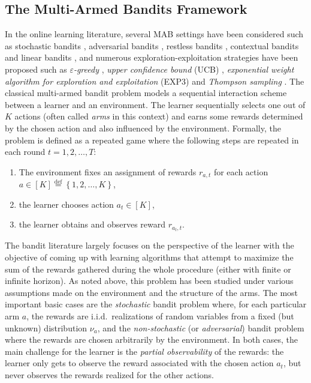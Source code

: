 \documentclass{article}
\begin{document}
	\subsection{The Multi-Armed Bandits Framework}
	In the online learning literature, several MAB settings have been considered such as stochastic bandits \cite{thompson1933likelihood,lai1985asymptotically,auer2002finite}, adversarial bandits \cite{auer1995gambling,auer2002nonstochastic}, restless bandits \cite{whittle1988restless}, contextual bandits \cite{LCLS10} and linear bandits \cite{abe2003reinforcement,APS11}, and numerous exploration-exploitation strategies have been proposed such as \textit{$\varepsilon$-greedy} \cite{sutton1998reinforcement,auer2002finite}, \textit{upper confidence bound} (UCB) \cite{lai1985asymptotically,Agr95,BuKa96,auer2002finite}, \textit{exponential weight algorithm for exploration and exploitation} (EXP3) \cite{auer1995gambling,auer2002finite} and \textit{Thompson sampling} \cite{thompson1933likelihood}. The classical multi-armed bandit problem models a sequential interaction scheme between a learner and an environment. The learner sequentially selects one out of $K$ actions (often called \emph{arms} in this context) and earns some rewards determined by the chosen action and also influenced by the environment. Formally, the problem 
	is defined as a repeated game where the following steps are repeated in each round $t=1,2,\dots,T$:
	\begin{enumerate}
		\item The environment fixes an assignment of rewards $r_{a,t}$ for each action $a\in[K] \stackrel{\text{def}}{=} \left\{1,2,\dots,K\right\}$,
		\item the learner chooses action $a_t\in[K]$,
		\item the learner obtains and observes reward $r_{a_t,t}$.
	\end{enumerate}
	The bandit literature largely focuses on the perspective of the learner with the objective of coming up with learning algorithms that attempt to maximize the sum of the rewards gathered during the whole procedure (either with finite or infinite horizon). As noted above, this problem has been studied under various assumptions made on the environment and the structure of the arms. The most important basic cases are the \emph{stochastic} bandit problem where, for each particular arm $a$, the rewards are i.i.d.~realizations of random variables from a fixed (but unknown) distribution $\nu_a$, and the \emph{non-stochastic} (or \emph{adversarial}) bandit problem where the rewards are chosen arbitrarily by the environment. In both cases, the main challenge for the learner is the \emph{partial observability} of the rewards: the learner only gets to observe the reward associated with the chosen action $a_t$, but never observes the rewards realized for the other actions.
	
\end{document}
